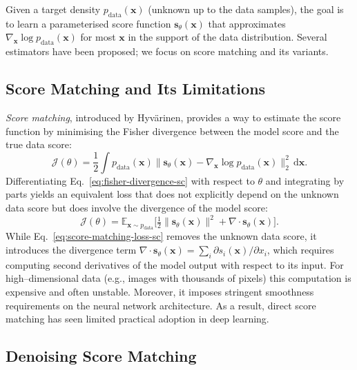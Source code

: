 Given a target density $p_{\text{data}}(\mathbf{x})$ (unknown up to the
data samples), the goal is to learn a parameterised score function
$\mathbf{s}_\theta(\mathbf{x})$ that approximates $\nabla_{\mathbf{x}} \log
p_{\text{data}}(\mathbf{x})$ for most $\mathbf{x}$ in the support of the
data distribution.  Several estimators have been proposed; we focus on
score matching and its variants.

\subsection{Score Matching and Its Limitations}

\emph{Score matching}, introduced by Hyv\"arinen, provides a way to
estimate the score function by minimising the Fisher divergence between the
model score and the true data score:
\begin{equation}
    \mathcal{J}(\theta) = \frac{1}{2} \int p_{\text{data}}(\mathbf{x})
    \big\| \mathbf{s}_\theta(\mathbf{x}) - \nabla_{\mathbf{x}}
    \log p_{\text{data}}(\mathbf{x}) \big\|_2^2 \,\mathrm{d}\mathbf{x}.
    \label{eq:fisher-divergence-sc}
\end{equation}
Differentiating Eq.~\eqref{eq:fisher-divergence-sc} with respect to $\theta$
and integrating by parts yields an equivalent loss that does not
explicitly depend on the unknown data score but does involve the divergence
of the model score:
\begin{equation}
    \mathcal{J}(\theta) = \mathbb{E}_{\mathbf{x}\sim p_{\text{data}}}
    \big[ \tfrac{1}{2} \| \mathbf{s}_\theta(\mathbf{x}) \|^2
    + \nabla\cdot\mathbf{s}_\theta(\mathbf{x}) \big].
    \label{eq:score-matching-loss-sc}
\end{equation}
While Eq.~\eqref{eq:score-matching-loss-sc} removes the unknown data score,
it introduces the divergence term $\nabla\cdot\mathbf{s}_\theta(\mathbf{x}) =
\sum_i \partial s_i(\mathbf{x}) / \partial x_i$, which requires computing
second derivatives of the model output with respect to its input.  For
high–dimensional data (e.g., images with thousands of pixels) this
computation is expensive and often unstable.  Moreover, it imposes
stringent smoothness requirements on the neural network architecture.  As a
result, direct score matching has seen limited practical adoption in deep
learning.

\subsection{Denoising Score Matching}

